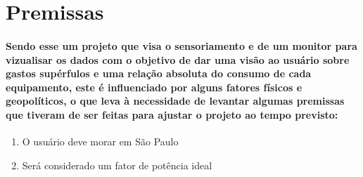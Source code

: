 \section{Premissas}
\paragraph{Sendo esse um projeto que visa o sensoriamento e de um monitor para vizualisar os dados com o objetivo de dar uma visão ao usuário sobre gastos supérfulos e uma relação absoluta do consumo de cada equipamento, este é influenciado por alguns fatores físicos e geopolíticos, o que leva à necessidade de levantar algumas premissas que tiveram de ser feitas para ajustar o projeto ao tempo previsto:
}
\begin{enumerate}
\item{O usuário deve morar em São Paulo}
\item{Será considerado um fator de potência ideal}
\end{enumerate}